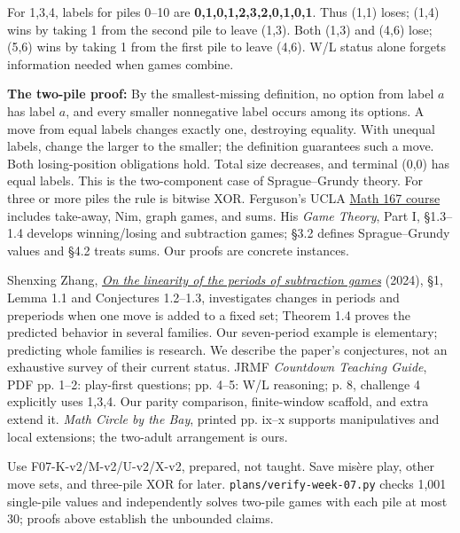 \documentclass[11pt]{article}
\begin{document}
\newpage
{}
For 1,3,4, labels for piles 0--10 are \textbf{0,1,0,1,2,3,2,0,1,0,1}. Thus (1,1) loses; (1,4) wins by taking 1 from the second pile to leave (1,3). Both (1,3) and (4,6) lose; (5,6) wins by taking 1 from the first pile to leave (4,6). W/L status alone forgets information needed when games combine.

\textbf{The two-pile proof:} By the smallest-missing definition, no option from label \(a\) has label \(a\), and every smaller nonnegative label occurs among its options. A move from equal labels changes exactly one, destroying equality. With unequal labels, change the larger to the smaller; the definition guarantees such a move. Both losing-position obligations hold. Total size decreases, and terminal (0,0) has equal labels. This is the two-component case of Sprague--Grundy theory. For three or more piles the rule is bitwise XOR.
Ferguson's UCLA \href{https://www.math.ucla.edu/~tom/GameTheory.html}{Math 167 course} includes take-away, Nim, graph games, and sums. His \emph{Game Theory}, Part I, \S1.3--1.4 develops winning/losing and subtraction games; \S3.2 defines Sprague--Grundy values and \S4.2 treats sums. Our proofs are concrete instances.

Shenxing Zhang, \href{https://zhangshenxing.github.io/publications/Zhang2024tcs%20On%20the%20linearity%20of%20the%20periods%20of%20subtraction%20games.pdf}{\emph{On the linearity of the periods of subtraction games}} (2024), \S1, Lemma 1.1 and Conjectures 1.2--1.3, investigates changes in periods and preperiods when one move is added to a fixed set; Theorem 1.4 proves the predicted behavior in several families. Our seven-period example is elementary; predicting whole families is research. We describe the paper's conjectures, not an exhaustive survey of their current status.
JRMF \emph{Countdown Teaching Guide}, PDF pp. 1--2: play-first questions; pp. 4--5: W/L reasoning; p. 8, challenge 4 explicitly uses 1,3,4. Our parity comparison, finite-window scaffold, and extra extend it. \emph{Math Circle by the Bay}, printed pp. ix--x supports manipulatives and local extensions; the two-adult arrangement is ours.

Use F07-K-v2/M-v2/U-v2/X-v2, prepared, not taught. Save mis\`ere play, other move sets, and three-pile XOR for later. \texttt{plans/verify-week-07.py} checks 1,001 single-pile values and independently solves two-pile games with each pile at most 30; proofs above establish the unbounded claims.
\end{document}
